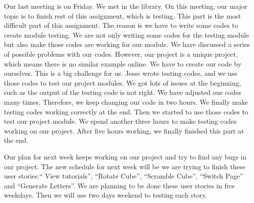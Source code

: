 \documentclass[12pt]{article}
\begin{document}
\par Our last meeting is on Friday. We met in the library. On this meeting, our major topic is to finish rest of this assignment, which is testing. This part is the most difficult part of this assignment. The reason is we have to write some codes to create module testing. We are not only writing some codes for the testing module but also make those codes are working for our module. We have discussed a series of possible problems with our codes. However, our project is a unique project, which means there is no similar example online. We have to create our code by ourselves. This is a big challenge for us. Jesse wrote testing codes, and we use those codes to test our project modules. We got lots of issues at the beginning, such as the output of the testing code is not right. We have adjusted our codes many times. Therefore, we keep changing our code in two hours. We finally make testing codes working correctly at the end. Then we started to use those codes to test our project module. We spend another three hours to make testing codes working on our project. After five hours working, we finally finished this part at the end. \\

\par Our plan for next week keeps working on our project and try to find any bugs in our project. The new schedule for next week will be we are trying to finish these user stories:“ View tutorials”, “Rotate Cube”, “Scramble Cube”, “Switch Page” and “Generate Letters”. We are planning to be done these user stories in five weekdays. Then we will use two days weekend to testing each story. \\
\end{document}
